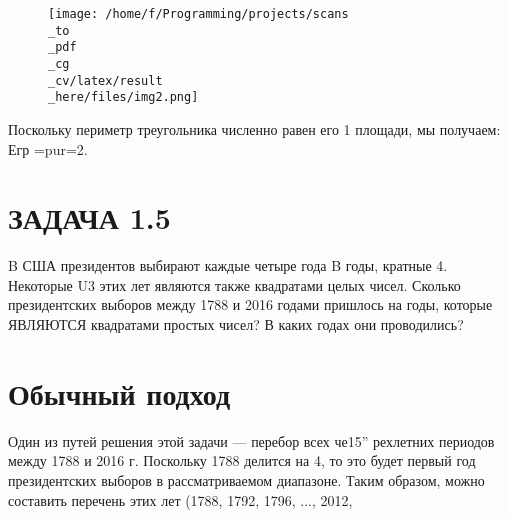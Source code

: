 \begin{figure}[!h]
\centering
\texttt{[image: /home/f/Programming/projects/scans\\\_to\\\_pdf\\\_cg\\\_cv/latex/result\\\_here/files/img2.png]}
\caption{}
\end{figure}
        

Поскольку периметр треугольника численно равен его 1 площади, мы получаем: Егр =pur=2.

\section{ЗАДАЧА 1.5}

B США президентов выбирают каждые четыре года B годы, кратные 4. Некоторые U3 этих лет являются также квадратами целых чисел. Сколько президентских выборов между 1788 и 2016 годами пришлось на годы, которые ЯВЛЯЮТСЯ квадратами простых чисел? В каких годах они проводились?

\section{Обычный подход}

Один из путей решения этой задачи — перебор всех че15” рехлетних периодов между 1788 и 2016 г. Поскольку 1788 делится на 4, то это будет первый год президентских выборов в рассматриваемом диапазоне. Таким образом, можно составить перечень этих лет (1788, 1792, 1796, ..., 2012,

